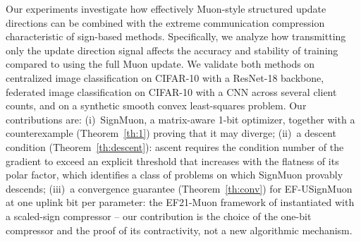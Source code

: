 \documentclass{article}
\begin{document}
Our experiments investigate how effectively Muon-style structured update directions can be combined with the extreme communication compression characteristic of sign-based methods. Specifically, we analyze how transmitting only the update direction signal affects the accuracy and stability of training compared to using the full Muon update. We validate both methods on centralized image classification on CIFAR-10 with a ResNet-18 backbone, federated image classification on CIFAR-10 with a CNN across several client counts, and on a synthetic smooth convex least-squares problem. Our contributions are:
(i)~SignMuon, a matrix-aware 1-bit optimizer, together with a counterexample (Theorem~\ref{th:1}) proving that it may diverge;
(ii)~a descent condition (Theorem~\ref{th:descent}): ascent requires the condition number of the gradient to exceed an explicit threshold that increases with the flatness of its polar factor, which identifies a class of problems on which SignMuon provably descends;
(iii)~a convergence guarantee (Theorem~\ref{th:conv}) for EF-USignMuon at one uplink bit per parameter: the EF21-Muon framework of \citet{gruntkowska2025error} instantiated with a scaled-sign compressor -- our contribution is the choice of the one-bit compressor and the proof of its contractivity, not a new algorithmic mechanism.
\end{document}
